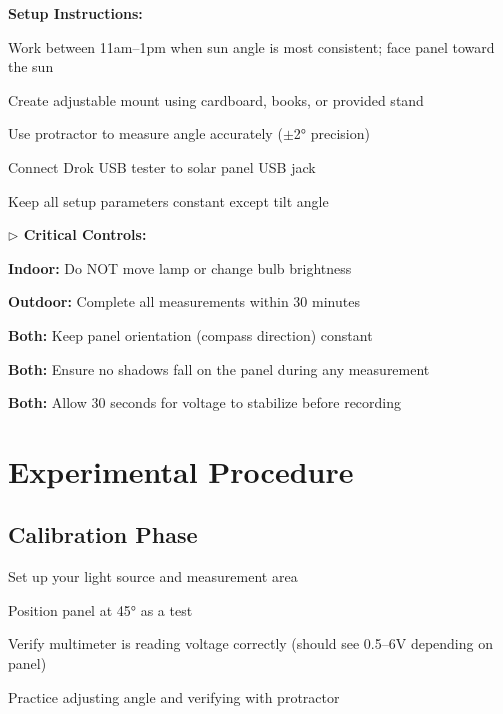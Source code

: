 \documentclass[11pt,twoside]{article}
\numberwithin{equation}{section}
\newcommand{\?}{\stackrel{?}{=}}
\begin{document}
\begin{procedurebox}
\textbf{Setup Instructions:}
\begin{compactenum}
    \item Work between 11am--1pm when sun angle is most consistent; face panel toward the sun
    \item Create adjustable mount using cardboard, books, or provided stand
    \item Use protractor to measure angle accurately ($\pm$2° precision)
    \item Connect Drok USB tester to solar panel USB jack
    \item Keep all setup parameters constant except tilt angle
\end{compactenum}
\end{procedurebox}

\begin{warningbox}
\textbf{$\triangleright$ Critical Controls:}
\begin{compactitem}
    \item \textbf{Indoor:} Do NOT move lamp or change bulb brightness
    \item \textbf{Outdoor:} Complete all measurements within 30 minutes
    \item \textbf{Both:} Keep panel orientation (compass direction) constant
    \item \textbf{Both:} Ensure no shadows fall on the panel during any measurement
    \item \textbf{Both:} Allow 30 seconds for voltage to stabilize before recording
\end{compactitem}
\end{warningbox}

\section{Experimental Procedure}

\subsection*{Calibration Phase}
\begin{compactenum} 
    \item Set up your light source and measurement area
    \item Position panel at 45° as a test
    \item Verify multimeter is reading voltage correctly (should see 0.5--6V depending on panel)
    \item Practice adjusting angle and verifying with protractor
\end{compactenum}
\end{document}
